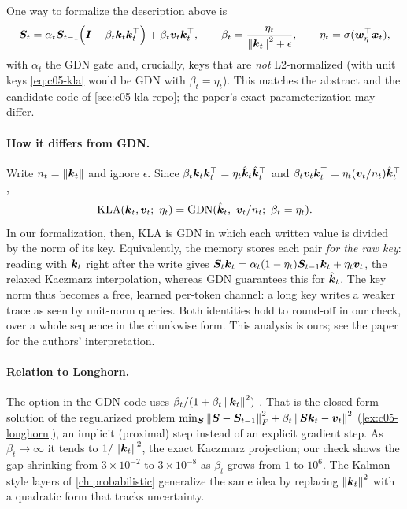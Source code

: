 One way to formalize the description above is
\begin{equation}\label{eq:c05-kla}
  \bm{S}_t = \alpha_t\bm{S}_{t-1}\Big(\bm{I} - \beta_t\bm{k}_t\bm{k}_t^{\top}\Big) + \beta_t\bm{v}_t\bm{k}_t^{\top},\qquad
  \beta_t = \frac{\eta_t}{\left\lVert \bm{k}_t\right\rVert^2 + \epsilon},\qquad \eta_t = \sigma(\bm{w}_\eta^{\top}\bm{x}_t),
\end{equation}
with $\alpha_t$ the GDN gate and, crucially, keys that are \emph{not} L2-normalized (with unit keys
\cref{eq:c05-kla} would be GDN with $\beta_t = \eta_t$). This matches the abstract and the
candidate code of \cref{sec:c05-kla-repo}; the paper's exact parameterization may differ.

\paragraph{How it differs from GDN.} Write $n_t = \left\lVert \bm{k}_t\right\rVert$ and ignore $\epsilon$. Since
$\beta_t\bm{k}_t\bm{k}_t^{\top} = \eta_t\hat{\bm{k}}_t\hat{\bm{k}}_t^{\top}$ and $\beta_t\bm{v}_t\bm{k}_t^{\top} = \eta_t(\bm{v}_t/n_t)\hat{\bm{k}}_t^{\top}$,
\begin{equation}\label{eq:c05-kla-gdn}
  \mathrm{KLA}(\vk_t, \vv_t;\ \eta_t) = \mathrm{GDN}(\hat\vk_t,\ \vv_t/n_t;\ \beta_t = \eta_t).
\end{equation}
In our formalization, then, KLA is GDN in which each written value is divided by the norm of its
key. Equivalently, the memory stores each pair \emph{for the raw key}: reading with $\bm{k}_t$ right
after the write gives $\bm{S}_t\bm{k}_t = \alpha_t(1-\eta_t)\bm{S}_{t-1}\bm{k}_t + \eta_t\bm{v}_t$, the relaxed
Kaczmarz interpolation, whereas GDN guarantees this for $\hat{\bm{k}}_t$. The key norm thus becomes a
free, learned per-token channel: a long key writes a weaker trace as seen by unit-norm queries.
Both identities hold to round-off in our check, over a whole sequence in the chunkwise form. This
analysis is ours; see the paper for the authors' interpretation.

\paragraph{Relation to Longhorn.} The  option in the GDN code uses
$\beta_t/(1 + \beta_t\left\lVert \bm{k}_t\right\rVert^2)$ \citep{c05-liu2024longhorn}. That is the closed-form solution
of the regularized problem $\min_{\bm{S}}\left\lVert \bm{S} - \bm{S}_{t-1}\right\rVert_F^2 + \beta_t\left\lVert \bm{S}\bm{k}_t - \bm{v}_t\right\rVert^2$
(\cref{ex:c05-longhorn}), an implicit (proximal) step instead of an explicit gradient step. As
$\beta_t\to\infty$ it tends to $1/\left\lVert \bm{k}_t\right\rVert^2$, the exact Kaczmarz projection; our check shows
the gap shrinking from $3\times10^{-2}$ to $3\times10^{-8}$ as $\beta_t$ grows from $1$ to $10^6$.
The Kalman-style layers of \cref{ch:probabilistic} generalize the same idea by replacing
$\left\lVert \bm{k}_t\right\rVert^2$ with a quadratic form that tracks uncertainty.

